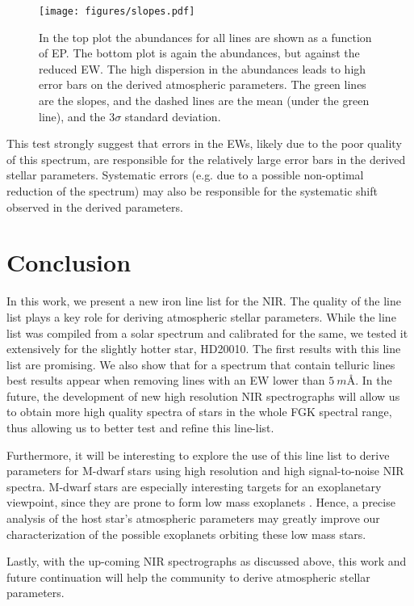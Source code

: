 \documentclass{aa}
\begin{document}
\begin{figure}[tpb!]
    \centering
    \texttt{[image: figures/slopes.pdf]}
    \caption{In the top plot the  abundances for all lines are
    shown as a function of EP. The bottom plot is again the 
    abundances, but against the reduced EW. The high dispersion in the abundances
    leads to high error bars on the derived atmospheric parameters. The green
    lines are the slopes, and the dashed lines are the mean (under the green line),
    and the $3 \sigma$ standard deviation.}
    \label{fig:slopes}
\end{figure}

This test strongly suggest that errors in the EWs, likely due to the poor
quality of this spectrum, are responsible for the relatively large error bars
in the derived stellar parameters. Systematic errors (e.g. due to a possible
non-optimal reduction of the spectrum) may also be responsible for the
systematic shift observed in the derived parameters.

\section{Conclusion}
\label{sec:conclusion}

In this work, we present a new iron line list for the NIR. The quality
of the line list plays a key role for deriving atmospheric stellar
parameters. While the line list was compiled from a solar spectrum and
calibrated for the same, we tested it extensively for the slightly
hotter star, HD20010. The first results with this line list are
promising. We also show that for a spectrum that contain telluric
lines best results appear when removing lines with an EW lower than
$\SI{5}{m\angstrom}$. In the future, the development of new high
resolution NIR spectrographs will allow us to obtain more high
quality spectra of stars in the whole FGK spectral range, thus
allowing us to better test and refine this line-list.

Furthermore, it will be interesting to explore the use of this
line list to derive parameters for M-dwarf stars using high resolution
and high signal-to-noise NIR spectra. M-dwarf stars are especially interesting
targets for an exoplanetary viewpoint, since they are prone to form
low mass exoplanets \citep{Bonfils2013}. Hence, a precise analysis
of the host star's atmospheric parameters may greatly improve our
characterization of the possible exoplanets orbiting these low mass
stars.

Lastly, with the up-coming NIR spectrographs as discussed above,
this work and future continuation will help the community to derive
atmospheric stellar parameters.
\end{document}
